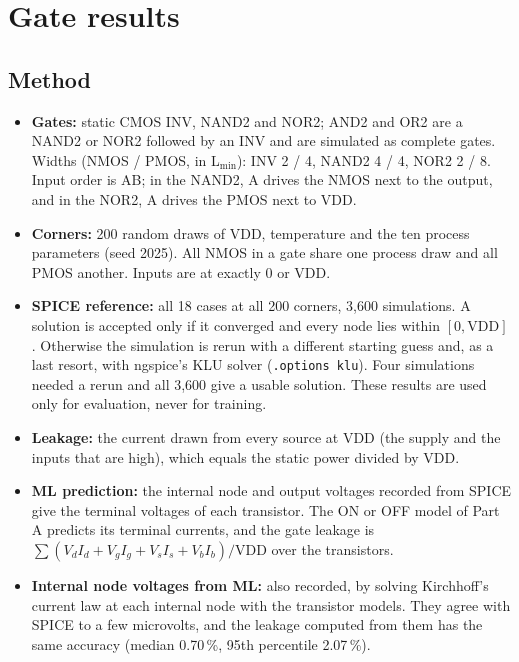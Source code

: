 \documentclass[10pt]{article}
\newcommand{\pct}{\,\%}
\begin{document}
\section{Gate results}

\subsection*{Method}

\begin{itemize}
\item \textbf{Gates:} static CMOS INV, NAND2 and NOR2; AND2 and OR2 are a NAND2 or NOR2 followed
by an INV and are simulated as complete gates. Widths (NMOS / PMOS, in L$_{\min}$): INV 2 / 4,
NAND2 4 / 4, NOR2 2 / 8. Input order is AB; in the NAND2, A drives the NMOS next to the output,
and in the NOR2, A drives the PMOS next to VDD.
\item \textbf{Corners:} 200 random draws of VDD, temperature and the ten process parameters (seed
2025). All NMOS in a gate share one process draw and all PMOS another. Inputs are at exactly 0 or
VDD.
\item \textbf{SPICE reference:} all 18 cases at all 200 corners, 3,600 simulations. A solution is
accepted only if it converged and every node lies within $[0, \text{VDD}]$. Otherwise the
simulation is rerun with a different starting guess and, as a last resort, with ngspice's KLU
solver (\texttt{.options klu}). Four simulations needed a rerun and all 3,600 give a usable
solution. These results are used only for evaluation, never for training.
\item \textbf{Leakage:} the current drawn from every source at VDD (the supply and the inputs that
are high), which equals the static power divided by VDD.
\item \textbf{ML prediction:} the internal node and output voltages recorded from SPICE give the
terminal voltages of each transistor. The ON or OFF model of Part A predicts its terminal
currents, and the gate leakage is $\sum (V_d I_d + V_g I_g + V_s I_s + V_b I_b) / \text{VDD}$ over
the transistors.
\item \textbf{Internal node voltages from ML:} also recorded, by solving Kirchhoff's current law at
each internal node with the transistor models. They agree with SPICE to a few microvolts, and the
leakage computed from them has the same accuracy (median 0.70\pct, 95th percentile 2.07\pct).
\end{itemize}
\end{document}
